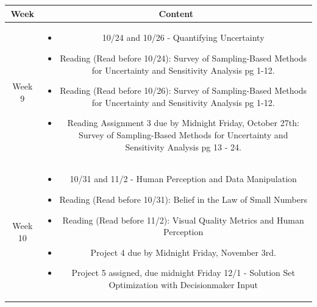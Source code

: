 \documentclass[11pt]{article}
\begin{document}
\begin{table}[h!]
\small %
\begin{tabular}{ | c | c | }
\hline
\textbf{Week} & \textbf{Content} \\
\hline

Week 9 & \begin{minipage}{.85\textwidth}
\begin{itemize} \itemsep-0.4em
	\vspace{1mm}
	\item 10/24 and 10/26 - Quantifying Uncertainty
	
	\item Reading (Read before 10/24): Survey of Sampling-Based Methods for Uncertainty and Sensitivity Analysis pg 1-12.
	\item Reading (Read before 10/26): Survey of Sampling-Based Methods for Uncertainty and Sensitivity Analysis pg 1-12.
	
	\item Reading Assignment 3 due by Midnight Friday, October 27th: Survey of Sampling-Based Methods for Uncertainty and Sensitivity Analysis pg 13 - 24.
	
	\vspace{1mm}
\end{itemize}
\end{minipage} \\
\hline

Week 10 & \begin{minipage}{.85\textwidth}
\begin{itemize} \itemsep-0.4em
	\vspace{1mm}
	\item 10/31 and 11/2 - Human Perception and Data Manipulation
	
	\item Reading (Read before 10/31): Belief in the Law of Small Numbers
	\item Reading (Read before 11/2): Visual Quality Metrics and Human Perception
	
	
	\item Project 4 due by Midnight Friday, November 3rd.
	\item Project 5 assigned, due midnight Friday 12/1 - Solution Set Optimization with Decisionmaker Input
	
	\vspace{1mm}
\end{itemize}
\end{minipage} \\
\hline


\end{tabular}
\end{table}
\end{document}
